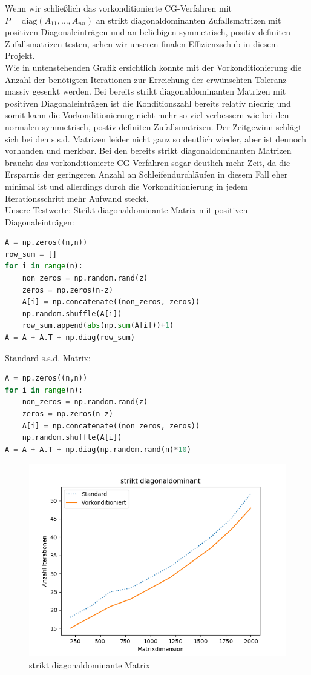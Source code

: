 Wenn wir schließlich das vorkonditionierte CG-Verfahren mit $P = \text{diag}(A_{11},\dots,A_{nn})$ an strikt diagonaldominanten
Zufallsmatrizen mit positiven Diagonaleinträgen und an beliebigen symmetrisch, positiv definiten Zufallsmatrizen testen, sehen
wir unseren finalen Effizienzschub in diesem Projekt. \\
Wie in untenstehenden Grafik ersichtlich konnte mit der Vorkonditionierung die Anzahl der benötigten Iterationen
zur Erreichung der erwünschten Toleranz massiv gesenkt werden. Bei bereits strikt diagonaldominanten Matrizen mit positiven
Diagonaleinträgen ist die Konditionszahl
bereits relativ niedrig und somit kann die Vorkonditionierung nicht mehr so viel verbessern wie bei den normalen symmetrisch,
postiv definiten Zufallsmatrizen. Der Zeitgewinn schlägt sich bei den s.s.d. Matrizen leider nicht ganz so deutlich wieder,
aber ist dennoch vorhanden und merkbar. Bei den bereits strikt diagonaldominanten Matrizen braucht das vorkonditionierte CG-Verfahren
sogar deutlich mehr Zeit, da die Ersparnis der geringeren Anzahl an Schleifendurchläufen in diesem Fall eher minimal ist und
allerdings durch die Vorkonditionierung in jedem Iterationsschritt mehr Aufwand steckt. \\
Unsere Testwerte: Strikt diagonaldominante Matrix mit positiven Diagonaleinträgen: \\
\begin{lstlisting}[language=Python]
A = np.zeros((n,n))
row_sum = []
for i in range(n):
    non_zeros = np.random.rand(z)
    zeros = np.zeros(n-z)
    A[i] = np.concatenate((non_zeros, zeros))
    np.random.shuffle(A[i])
    row_sum.append(abs(np.sum(A[i]))+1)
A = A + A.T + np.diag(row_sum)
\end{lstlisting}
Standard s.s.d. Matrix:
\begin{lstlisting}[language=Python]
A = np.zeros((n,n))
for i in range(n):
    non_zeros = np.random.rand(z)
    zeros = np.zeros(n-z)
    A[i] = np.concatenate((non_zeros, zeros))
    np.random.shuffle(A[i])
A = A + A.T + np.diag(np.random.rand(n)*10)
\end{lstlisting}
\FloatBarrier
\begin{figure}
    \centering
    \includegraphics[width=\linewidth]{Aufgabe_1/f_strikt.png}
    \caption{strikt diagonaldominante Matrix}
\end{figure}
